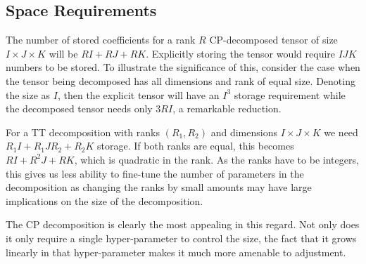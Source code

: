 
\subsection{Space Requirements}
The number of stored coefficients for a rank \(R\) CP-decomposed tensor of size 
\(I \times J \times K\) will be \(RI + RJ + RK\). Explicitly storing the tensor would require
\(IJK\) numbers to be stored. To illustrate the significance of this, consider the case when
the tensor being decomposed has all dimensions and rank of equal size. Denoting the size as
\(I\), then the explicit tensor will have an \(I^3\) storage requirement while the decomposed
tensor needs only \(3RI\), a remarkable reduction.

For a TT decomposition with ranks \((R_1, R_2)\) and dimensions \(I \times J \times K\) we need
\(R_1I + R_1JR_2 + R_2K\) storage. If both ranks are equal, this becomes \(RI + R^2J + RK\), which
is quadratic in the rank. As the ranks have to be integers, this gives us less ability to fine-tune the
number of parameters in the decomposition as changing the ranks by small amounts may have large
implications on the size of the decomposition.

The CP decomposition is clearly the most appealing in this regard. Not only does it only require a
single hyper-parameter to control the size, the fact that it grows linearly in that hyper-parameter
makes it much more amenable to adjustment.

